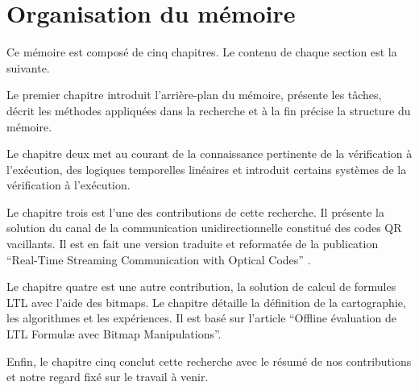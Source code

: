 \section{Organisation du mémoire}

Ce mémoire est composé de cinq chapitres. Le contenu de chaque section est la suivante.

Le premier chapitre introduit l'arrière-plan du mémoire, présente les tâches, décrit les méthodes appliquées dans la recherche et à la fin précise la structure du mémoire.

Le chapitre deux met au courant de la connaissance pertinente de la vérification à l'exécution, des logiques temporelles linéaires et introduit certains systèmes de la vérification à l'exécution.

Le chapitre trois est l'une des contributions de cette recherche. Il présente la solution du canal de la communication unidirectionnelle constitué des codes QR vacillants. Il est en fait une version traduite et reformatée de la publication ``Real-Time Streaming Communication with Optical Codes'' \citep{kxie7370891}.

Le chapitre quatre est une autre contribution, la solution de calcul de formules LTL avec l'aide des bitmaps. Le chapitre détaille la définition de la cartographie, les algorithmes et les expériences. Il est basé sur l'article ``Offline évaluation de LTL Formul\ae{} avec Bitmap Manipulations''.

Enfin, le chapitre cinq conclut cette recherche avec le résumé de nos contributions et notre regard fixé sur le travail à venir.